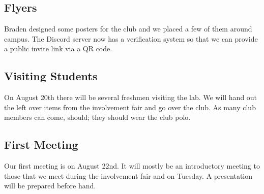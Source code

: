 \subsection{Flyers}
Braden designed some posters for the club and we placed a few of them around
campus. The Discord server now has a verification system so that we can provide
a public invite link via a QR code.

\subsection{Visiting Students}
On August 20th there will be several freshmen visiting the lab. We will hand out
the left over items from the involvement fair and go over the club. As many club
members can come, should; they should wear the club polo. 

\subsection{First Meeting}
Our first meeting is on August 22nd. It will mostly be an introductory meeting
to those that we meet during the involvement fair and on Tuesday. A presentation
will be prepared before hand.
